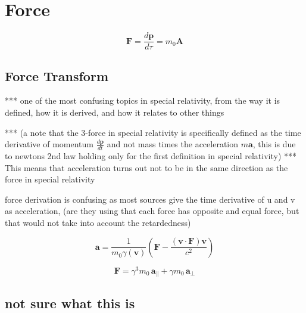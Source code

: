 \section{Force}

\begin{equation}
	\mathbf{F}= \frac{d\mathbf{p}}{d\tau} = m_0\mathbf{A}
\end{equation}

\subsection{Force Transform}

*** one of the most confusing topics in special relativity, from the way it is defined, how it is derived, and how it relates to other things\newline

*** (a note that the 3-force in special relativity is specifically defined as the time derivative of momentum $\frac{d\mathbf{p}}{dt}$ and not mass times the acceleration $m\mathbf{a}$, this is due to newtons 2nd law holding only for the first definition in special relativity) \newline
*** This means that acceleration turns out not to be in the same direction as the force in special relativity\newline

force derivation is confusing as most sources give the time derivative of u and v as acceleration, (are they using that each force has opposite and equal force, but that would not take into account the retardedness)

\begin{equation}
	\mathbf{a} = \frac{1}{m_0 \gamma(\mathbf{v})} \left( \mathbf{F} - \frac{ ( \mathbf{v} \cdot \mathbf{F} ) \mathbf{v} }{c^2} \right)
\end{equation}

\begin{equation}
	\mathbf{F} = \gamma^3 m_0 \, \mathbf{a}_\parallel + \gamma m_0 \, \mathbf{a}_\perp
\end{equation}

\subsection{not sure what this is}

